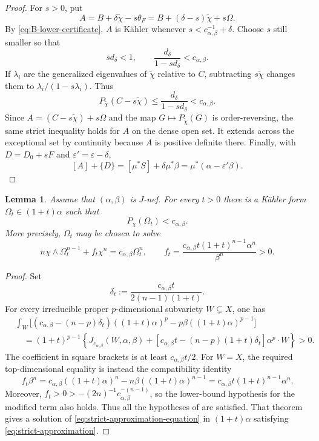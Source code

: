 \documentclass[reqno]{amsart}
\newcommand{\cab}{c_{\alpha,\beta}}
\theoremstyle{plain}
\newtheorem{lemma}[thm]{Lemma}
\theoremstyle{remark}
\begin{document}
\begin{proof}
For $s>0$, put
\[
 A=B+\delta\widetilde\chi-s\theta_F
   =B+(\delta-s)\widetilde\chi+s\Omega.
\]
By \eqref{eq:B-lower-certificate}, $A$ is K\"ahler whenever
$s<\cab^{-1}+\delta$.  Choose $s$ still smaller so that
\[
 sd_\delta<1,\qquad
 \frac{d_\delta}{1-sd_\delta}<\cab.
\]
If $\lambda_i$ are the generalized eigenvalues of
$\widetilde\chi$ relative to $C$, subtracting
$s\widetilde\chi$ changes them to
$\lambda_i/(1-s\lambda_i)$.  Thus
\[
 P_{\widetilde\chi}(C-s\widetilde\chi)
 \leq\frac{d_\delta}{1-sd_\delta}<\cab.
\]
Since $A=(C-s\widetilde\chi)+s\Omega$ and the map
$G\mapsto P_{\widetilde\chi}(G)$ is order-reversing, the same strict
inequality holds for $A$ on the dense open set. It extends across the
exceptional set by continuity because $A$ is positive definite there.
Finally, with $D=D_0+sF$ and
$\varepsilon'=\varepsilon-\delta$,
\[
 [A]+\{D\}
 =[\mu^*S]+\delta\mu^*\beta
 =\mu^*(\alpha-\varepsilon'\beta).
\]
\end{proof}

\begin{lemma}\label{lem:strict-approximation}
Assume that $(\alpha,\beta)$ is $J$-nef. For every $t>0$ there is a
K\"ahler form $\Omega_t\in(1+t)\alpha$ such that
\begin{equation}\label{eq:strict-approximation}
 P_\chi(\Omega_t)<\cab.
\end{equation}
More precisely, $\Omega_t$ may be chosen to solve
\begin{equation}\label{eq:strict-approximation-equation}
 n\chi\wedge\Omega_t^{n-1}+f_t\chi^n=\cab\Omega_t^n,
 \qquad
 f_t=\frac{\cab t(1+t)^{n-1}\alpha^n}{\beta^n}>0.
\end{equation}
\end{lemma}
\begin{proof}
Set
\[
 \delta_t:=\frac{\cab t}{2(n-1)(1+t)}.
\]
For every irreducible proper $p$-dimensional subvariety $W\subsetneq X$,
one has
\begin{align*}
&\int_W\bigl[(\cab-(n-p)\delta_t)((1+t)\alpha)^p
             -p\beta((1+t)\alpha)^{p-1}\bigr]\\
&\quad=(1+t)^{p-1}\left\{
 J_{\cab}(W,\alpha,\beta)
 +[\cab t-(n-p)(1+t)\delta_t]\alpha^p\cdot W
 \right\}>0.
\end{align*}
The coefficient in square brackets is at least $\cab t/2$. For
$W=X$, the required top-dimensional equality is instead the
compatibility identity
\[
 f_t\beta^n
 =\cab((1+t)\alpha)^n
  -n\beta((1+t)\alpha)^{n-1}
 =\cab t(1+t)^{n-1}\alpha^n.
\]
Moreover, $f_t>0>-(2n)^{-1}\cab^{-(n-1)}$, so the lower-bound
hypothesis for the modified term also holds. Thus all the hypotheses
of \cite[Theorem~1.11]{C21} are satisfied. That theorem gives a solution of
\eqref{eq:strict-approximation-equation} in $(1+t)\alpha$ satisfying
\eqref{eq:strict-approximation}.
\end{proof}
\end{document}
